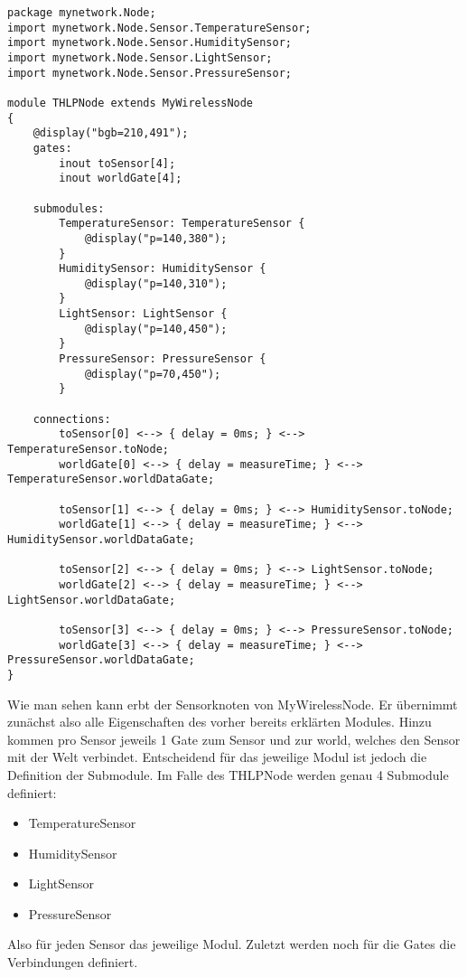 \begin{lstlisting}[language=ned,caption={THLPNode},label=lst:THLPNode]
package mynetwork.Node;
import mynetwork.Node.Sensor.TemperatureSensor;
import mynetwork.Node.Sensor.HumiditySensor;
import mynetwork.Node.Sensor.LightSensor;
import mynetwork.Node.Sensor.PressureSensor;

module THLPNode extends MyWirelessNode
{
    @display("bgb=210,491");
    gates:
        inout toSensor[4];
        inout worldGate[4];

    submodules:
        TemperatureSensor: TemperatureSensor {
            @display("p=140,380");
        }
        HumiditySensor: HumiditySensor {
            @display("p=140,310");
        }
        LightSensor: LightSensor {
            @display("p=140,450");
        }
        PressureSensor: PressureSensor {
            @display("p=70,450");
        }

    connections:
        toSensor[0] <--> { delay = 0ms; } <--> TemperatureSensor.toNode;
        worldGate[0] <--> { delay = measureTime; } <--> TemperatureSensor.worldDataGate;

        toSensor[1] <--> { delay = 0ms; } <--> HumiditySensor.toNode;
        worldGate[1] <--> { delay = measureTime; } <--> HumiditySensor.worldDataGate;
        
        toSensor[2] <--> { delay = 0ms; } <--> LightSensor.toNode;
        worldGate[2] <--> { delay = measureTime; } <--> LightSensor.worldDataGate;
        
        toSensor[3] <--> { delay = 0ms; } <--> PressureSensor.toNode;
        worldGate[3] <--> { delay = measureTime; } <--> PressureSensor.worldDataGate;
}
\end{lstlisting}

Wie man sehen kann erbt der Sensorknoten von MyWirelessNode. Er übernimmt zunächst also alle Eigenschaften des vorher bereits erklärten Modules. Hinzu kommen pro Sensor jeweils 1 Gate zum Sensor und zur world, welches den Sensor mit der Welt verbindet. \newline
Entscheidend für das jeweilige Modul ist jedoch die Definition der Submodule. Im Falle des THLPNode werden genau 4 Submodule definiert:
\begin{itemize}
\item TemperatureSensor
\item HumiditySensor
\item LightSensor
\item PressureSensor
\end{itemize}
Also für jeden Sensor das jeweilige Modul.\newline
Zuletzt werden noch für die Gates die Verbindungen definiert.

